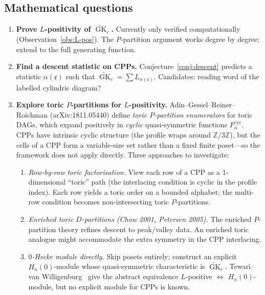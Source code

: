 \documentclass[11pt]{article}
\theoremstyle{plain}
\theoremstyle{definition}
\theoremstyle{remark}
\newcommand{\Z}{\mathbb{Z}}
\newcommand{\GK}{\operatorname{GK}}
\begin{document}
\subsection*{Mathematical questions}
\begin{enumerate}
\item \textbf{Prove $L$-positivity of $\widetilde{\GK}_c$.}
  Currently only verified computationally
  (Observation~\ref{obs:L-pos}).
  The $P$-partition argument works degree by degree; extend to
  the full generating function.

\item \textbf{Find a descent statistic on CPPs.}
  Conjecture~\ref{conj:descent} predicts a statistic
  $\alpha(\mathfrak{c})$ such that
  $\widetilde{\GK}_c = \sum L_{\alpha(\mathfrak{c})}$.
  Candidates: reading word of the labelled cylindric diagram?

\item \textbf{Explore toric $P$-partitions for $L$-positivity.}
  Adin--Gessel--Reiner--Roichman (arXiv:1811.05440) define
  \emph{toric $P$-partition enumerators} for toric DAGs, which
  expand positively in \emph{cyclic} quasi-symmetric functions
  $F^{\mathrm{cyc}}_\alpha$.  CPPs have intrinsic cyclic structure
  (the profile wraps around $\Z/3\Z$), but the cells of a CPP
  form a variable-size set rather than a fixed finite poset---so
  the framework does not apply directly.  Three approaches to investigate:
  \begin{enumerate}
  \item[(a)] \emph{Row-by-row toric factorisation.}
    View each row of a CPP as a 1-dimensional ``toric'' path
    (the interlacing condition is cyclic in the profile index).
    Each row yields a toric order on a bounded alphabet;
    the multi-row condition becomes non-intersecting toric
    $P$-partitions.
  \item[(b)] \emph{Enriched toric $D$-partitions (Chow 2001,
    Petersen 2005).}  The enriched $P$-partition theory refines
    descent to peak/valley data.  An enriched toric analogue
    might accommodate the extra symmetry in the CPP interlacing.
  \item[(c)] \emph{$0$-Hecke module directly.}
    Skip posets entirely; construct an explicit $H_n(0)$-module
    whose quasi-symmetric characteristic is $\widetilde{\GK}_c$.
    Tewari--van Willigenburg~\cite{tewari-vanwilligenburg} give
    the abstract equivalence $L$-positive $\Leftrightarrow$
    $H_n(0)$-module, but no explicit module for CPPs is known.
  \end{enumerate}


\end{enumerate}
\end{document}
